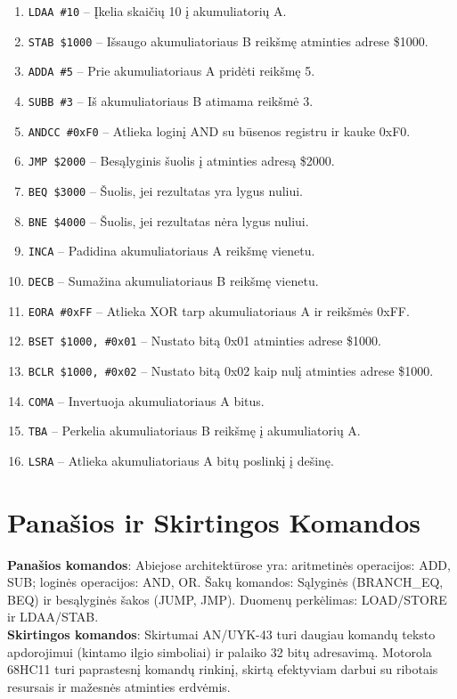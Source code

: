 \documentclass[a4paper,12pt]{article}
\begin{document}
\begin{enumerate}
    \item \texttt{LDAA \#10} – Įkelia skaičių 10 į akumuliatorių A.
    \item \texttt{STAB \$1000} – Išsaugo akumuliatoriaus B reikšmę atminties adrese \$1000.
    \item \texttt{ADDA \#5} – Prie akumuliatoriaus A pridėti reikšmę 5.
    \item \texttt{SUBB \#3} – Iš akumuliatoriaus B atimama reikšmė 3.
    \item \texttt{ANDCC \#0xF0} – Atlieka loginį AND su būsenos registru ir kauke 0xF0.
    \item \texttt{JMP \$2000} – Besąlyginis šuolis į atminties adresą \$2000.
    \item \texttt{BEQ \$3000} – Šuolis, jei rezultatas yra lygus nuliui.
    \item \texttt{BNE \$4000} – Šuolis, jei rezultatas nėra lygus nuliui.
    \item \texttt{INCA} – Padidina akumuliatoriaus A reikšmę vienetu.
    \item \texttt{DECB} – Sumažina akumuliatoriaus B reikšmę vienetu.
    \item \texttt{EORA \#0xFF} – Atlieka XOR tarp akumuliatoriaus A ir reikšmės 0xFF.
    \item \texttt{BSET \$1000, \#0x01} – Nustato bitą 0x01 atminties adrese \$1000.
    \item \texttt{BCLR \$1000, \#0x02} – Nustato bitą 0x02 kaip nulį atminties adrese \$1000.
    \item \texttt{COMA} – Invertuoja akumuliatoriaus A bitus.
    \item \texttt{TBA} – Perkelia akumuliatoriaus B reikšmę į akumuliatorių A.
    \item \texttt{LSRA} – Atlieka akumuliatoriaus A bitų poslinkį į dešinę.
\end{enumerate}
\section*{Panašios ir Skirtingos Komandos}
\textbf{Panašios komandos}: 
Abiejose architektūrose yra: aritmetinės operacijos: ADD, SUB; loginės operacijos: AND, OR.
Šakų komandos: Sąlyginės (BRANCH_EQ, BEQ) ir besąlyginės šakos (JUMP, JMP).
Duomenų perkėlimas: LOAD/STORE ir LDAA/STAB.\\
\textbf{Skirtingos komandos}: 
Skirtumai
AN/UYK-43 turi daugiau komandų teksto apdorojimui (kintamo ilgio simboliai) ir palaiko 32 bitų adresavimą.
Motorola 68HC11 turi paprastesnį komandų rinkinį, skirtą efektyviam darbui su ribotais resursais ir mažesnės atminties erdvėmis.
\end{document}
